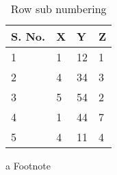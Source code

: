 \documentclass{elsarticle}
\begin{document}
\begin{table}[]
  \centering
  \begin{threeparttable}
    \caption{Row sub numbering}
    \label{my-label}
    \begin{tabular}{llll}
      \toprule
      S. No. & X & Y & Z \\
      \midrule
      1 & 1 & 12 & 1 \\
      2 & 4 & 34 & 3 \\
      3 & 5 & 54 & 2\tnote{a} \\
      4 & 1 & 44 & 7 \\
      5 & 4 & 11 & 4 \\
      \bottomrule
    \end{tabular}
    \begin{tablenotes}
      \item[a]{Footnote}
    \end{tablenotes}
  \end{threeparttable}
\end{table}
\end{document}
